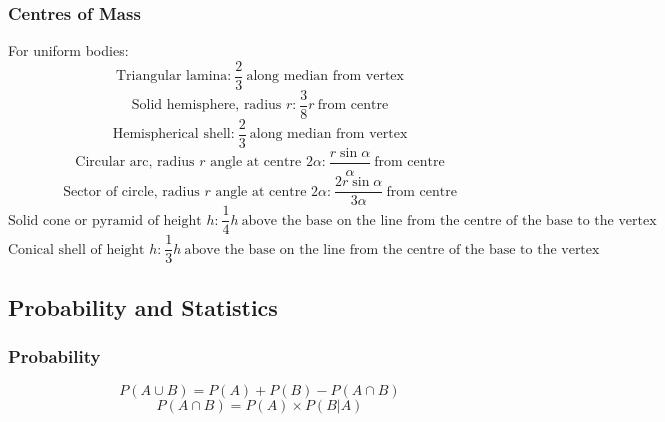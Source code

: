 \documentclass{book}
\begin{document}
            \subsubsection{Centres of Mass}
            For uniform bodies: \\
            \begin{equation}
                \text{Triangular lamina:}\ \frac{2}{3}\ \text{along median from vertex}
            \end{equation}
            \begin{equation}
                \text{Solid hemisphere, radius }r\text{:}\ \frac{3}{8}r\ \text{from centre}
            \end{equation}
            \begin{equation}
                \text{Hemispherical shell:}\ \frac{2}{3}\ \text{along median from vertex}
            \end{equation}
            \begin{equation}
                \text{Circular arc, radius }r\text{ angle at centre }2\alpha\text{:}\ \frac{r\sin\alpha}{\alpha}\ \text{from centre}
            \end{equation}
            \begin{equation}
                \text{Sector of circle, radius }r\text{ angle at centre }2\alpha\text{:}\ \frac{2r\sin\alpha}{3\alpha}\ \text{from centre}
            \end{equation}
            \begin{equation}
                \text{Solid cone or pyramid of height }h\text{:}\ \frac{1}{4}h\ \text{above the base on the line from the centre of the base to the vertex}
            \end{equation}
            \begin{equation}
                \text{Conical shell of height }h\text{:}\ \frac{1}{3}h\ \text{above the base on the line from the centre of the base to the vertex}
            \end{equation}
        \newpage

        \subsection{Probability and Statistics}
        \subsubsection{Probability}
        \begin{equation}
            P(A\cup B)=P(A)+P(B)-P(A\cap B)
        \end{equation}
        \begin{equation}
            P(A\cap B)=P(A)\times P(B|A)
        \end{equation}
\end{document}
